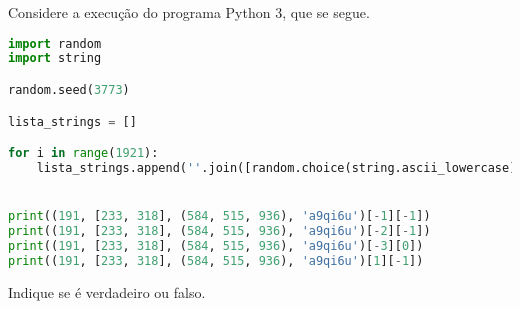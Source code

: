\documentclass[12pt,varwidth=16cm,border=17pt]{standalone}
\begin{document}
Considere a execução do programa Python 3, que se segue. 

\begin{lstlisting}[language=Python]
import random
import string

random.seed(3773)

lista_strings = []

for i in range(1921):
	lista_strings.append(''.join([random.choice(string.ascii_lowercase) for i in range(7)]))


print((191, [233, 318], (584, 515, 936), 'a9qi6u')[-1][-1])
print((191, [233, 318], (584, 515, 936), 'a9qi6u')[-2][-1])
print((191, [233, 318], (584, 515, 936), 'a9qi6u')[-3][0])
print((191, [233, 318], (584, 515, 936), 'a9qi6u')[1][-1])
\end{lstlisting}

Indique se é verdadeiro ou falso.
\end{document}
